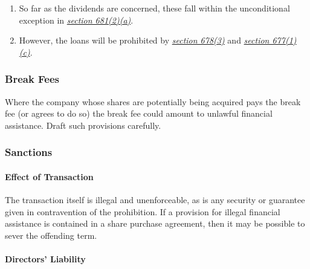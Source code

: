 \documentclass[
]{article}
\providecommand{\tightlist}{%
  \setlength{\itemsep}{0pt}\setlength{\parskip}{0pt}}
\begin{document}
\begin{enumerate}
  \begin{enumerate}
  \tightlist
  \item
    So far as the dividends are concerned, these fall within the
    unconditional exception in
    \emph{\href{https://uk.westlaw.com/8-506-2055?originationContext=document\&transitionType=PLDocumentLink\&contextData=(sc.Default)\&ppcid=fc9f4d9e83af4b4c8d47bf5847a3205c}{section
    681(2)(a)}}.
  \item
    However, the loans will be prohibited by
    \emph{\href{https://uk.westlaw.com/5-505-7258?originationContext=document\&transitionType=PLDocumentLink\&contextData=(sc.Default)\&ppcid=fc9f4d9e83af4b4c8d47bf5847a3205c}{section
    678(3)}} and
    \emph{\href{https://uk.westlaw.com/8-505-7474?originationContext=document\&transitionType=PLDocumentLink\&contextData=(sc.Default)\&ppcid=fc9f4d9e83af4b4c8d47bf5847a3205c}{section
    677(1)(c)}}.
  \end{enumerate}
\end{enumerate}

\hypertarget{break-fees}{%
\subsubsection{Break Fees}\label{break-fees}}

Where the company whose shares are potentially being acquired pays the
break fee (or agrees to do so) the break fee could amount to unlawful
financial assistance. Draft such provisions carefully.

\hypertarget{sanctions}{%
\subsubsection{Sanctions}\label{sanctions}}

\hypertarget{effect-of-transaction}{%
\paragraph{Effect of Transaction}\label{effect-of-transaction}}

The transaction itself is illegal and unenforceable, as is any security
or guarantee given in contravention of the prohibition. If a provision
for illegal financial assistance is contained in a share purchase
agreement, then it may be possible to sever the offending term.

\hypertarget{directors-liability}{%
\paragraph{Directors' Liability}\label{directors-liability}}
\end{document}

